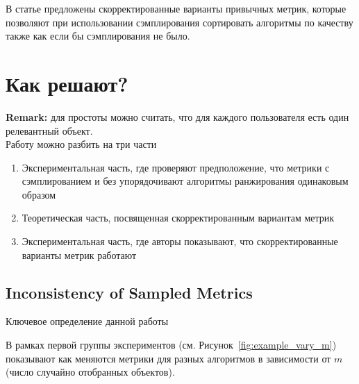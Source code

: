 В статье предложены скорректированные варианты привычных метрик, которые позволяют при использовании сэмплирования сортировать алгоритмы по качеству также как если бы сэмплирования не было. 

\section*{Как решают?}

\textbf{Remark:} для простоты можно считать, что для каждого пользователя есть один релевантный объект. \\

Работу можно разбить на три части
\begin{enumerate}
    \item Экспериментальная часть, где проверяют предположение, что метрики с сэмплированием и без упорядочивают алгоритмы ранжирования одинаковым образом
    \item Теоретическая часть, посвященная скорректированным вариантам метрик
    \item Экспериментальная часть, где авторы показывают, что скорректированные варианты метрик работают
\end{enumerate}

\subsection*{Inconsistency of Sampled Metrics}

Ключевое определение данной работы


В рамках первой группы экспериментов (см. Рисунок~\ref{fig:example_vary_m}) показывают как меняются метрики для разных алгоритмов в зависимости от $m$ (число случайно отобранных объектов). \\

